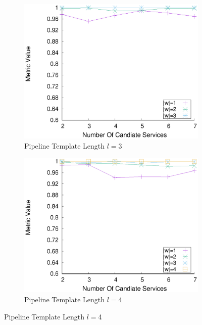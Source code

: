     \begin{figure}[ht!]
      \centering
      \begin{subfigure}{0.49\textwidth}
        \includegraphics[width=\textwidth]{Images/graphs/window_quality_performance_diff_qual_n7_s7_20_100_n3}
        \caption{Pipeline Template Length $l$$=$3}
        \label{fig:quality_window_wide_qualitative_n3}
      \end{subfigure}
      \hfill
      \begin{subfigure}{0.49\textwidth}
        \includegraphics[width=\textwidth]{Images/graphs/window_quality_performance_diff_qual_n7_s7_20_100_n4}
        \caption{Pipeline Template Length $l$$=$4}

\end{subfigure}
\end{figure}
